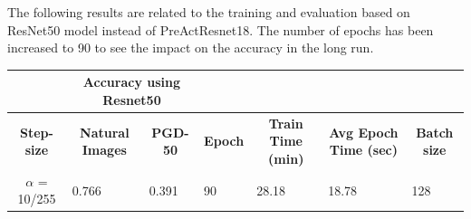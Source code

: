 \documentclass{article}
\begin{document}
\newpage

The following results are related to the training and evaluation based on
ResNet50 model instead of PreActResnet18. The number of epochs has been
increased to 90 to see the impact on the accuracy in the long run. 

\begin{table}[hbt!]
\begin{tabular}{|c|c|l|l|l|l|l|}
\hline
\multicolumn{1}{|l|}{}    & \multicolumn{2}{c|}{\textbf{Accuracy using
Resnet50}}                               & \multicolumn{4}{l|}{\textbf{}}
\\ \hline
\textbf{Step-size}        & \textbf{Natural Images}                      &
\multicolumn{1}{c|}{\textbf{PGD-50}} & \multicolumn{1}{c|}{\textbf{Epoch}} &
\multicolumn{1}{c|}{\textbf{Train Time (min)}} & \multicolumn{1}{c|}{\textbf{Avg
Epoch Time (sec)}} & \multicolumn{1}{c|}{\textbf{Batch size}} \\ \hline
$\alpha$ = 10/255 & \multicolumn{1}{l|}{0.766} & { 0.391}         & { 90}
& { 28.18}                   & { 18.78}                       & { 128}
\\ \hline
\end{tabular}
\end{table}
\end{document}
